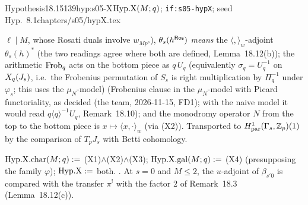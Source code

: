 \begin{quoted}{Hypothesis}{18.15}{139}{hyp:s05-X}{$\mathrm{Hyp.X}(M;q)$; \texttt{if:s05-hypX}; seed Hyp.~8.1}{chapters/s05/hypX.tex}
\begin{enumerate}[label=(X\arabic*)]
  $\ell\mid M$, whose Rosati duals involve $w_{Mp^s}$), $\theta_s(h^{\mathsf{Ros}})$ \emph{means} the $\langle,\rangle_w$-adjoint $\theta_s(h)^*$ (the two readings
  agree where both are defined, Lemma~18.12(b)); the arithmetic $\mathrm{Frob}_q$ acts on the bottom piece as $q\,U_q$
  (equivalently $\sigma_q=U_q^{-1}$ on $X_q(J_s)$, i.e.\ the Frobenius permutation of $S_s$ is right multiplication by $\Pi_q^{-1}$ under
  $\varphi_s$; this uses the $\mu_N$-model)
  (Frobenius clause in the $\mu_N$-model with Picard functoriality, as decided (the team, 2026-11-15, FD1); with the naive model it would read
  $q\langle q\rangle^{-1}U_q$, Remark~18.10);
  and the monodromy operator $N$ from the top to the bottom piece is $x\mapsto\langle x,\cdot\rangle_w$ (via (X2)). Transported to
  $H^1_{\rm par}(\Gamma_s,\mathbb{Z}_p)(1)$ by the comparison of $T_pJ_s$ with Betti cohomology.
\end{enumerate}
$\mathrm{Hyp.X.char}(M;q):=$ (X1)$\wedge$(X2)$\wedge$(X3); $\mathrm{Hyp.X.gal}(M;q):=$ (X4) (presupposing the family $\varphi$); $\mathrm{Hyp.X}:=$ both. \sthyp.
At $s=0$ and $M\le2$, the $u$-adjoint of $\beta_{s'0}$ is compared with the transfer $\pi^!$ with the factor $2$ of Remark~18.3 (Lemma~18.12(c)).
\end{quoted}
